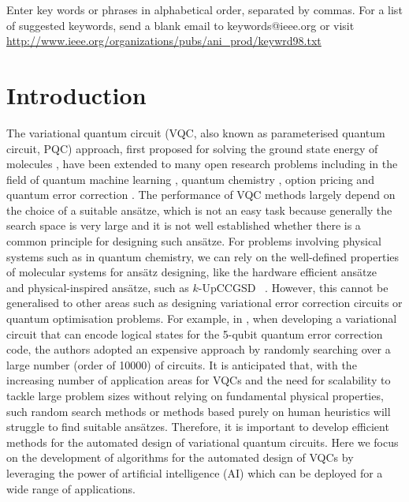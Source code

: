 \documentclass{ieeeaccess}
\begin{document}
\begin{keywords}
Enter key words or phrases in alphabetical 
order, separated by commas. For a list of suggested keywords, send a blank 
email to keywords@ieee.org or visit \underline
{http://www.ieee.org/organizations/pubs/ani\_prod/keywrd98.txt}
\end{keywords}

\titlepgskip=-15pt

\maketitle

\section{Introduction}
The variational quantum circuit (VQC, also known as parameterised quantum circuit, PQC) approach, first proposed for solving the ground state energy of molecules \cite{peruzzo2014variational}, have been extended to many open research problems including in the field of quantum machine learning \cite{schuldpetruccione2021}, quantum chemistry \cite{RevModPhys.92.015003}, option pricing \cite{2020optionpricing} and quantum error correction \cite{johnson2017qvector, Xu2021-dt}. The performance of VQC methods largely depend on the choice of a suitable ans\"atze, which is not an easy task because generally the search space is very large and it is not well established whether there is a common principle for designing such ans\"atze. For problems involving physical systems such as in quantum chemistry, we can rely on the well-defined properties of molecular systems for ans\"atz designing, like the  hardware efficient ans\"atze~\cite{2017hardwareefficientvqe} and physical-inspired ans\"atze, such as $k$-UpCCGSD~ \cite{physicalinspiredansatze1doi:10.1021/acs.jctc.8b01004}. However, this cannot be generalised to other areas such as designing variational error correction circuits or quantum optimisation problems. For example, in \cite{Xu2021-dt}, when developing a variational circuit that can encode logical states for the 5-qubit quantum error correction code, the authors adopted an expensive approach by randomly searching over a large number (order of 10000) of circuits. It is anticipated that, with the increasing number of application areas for VQCs and the need for scalability to tackle large problem sizes without relying on fundamental physical properties, such random search methods or methods based purely on human heuristics will struggle to find suitable ans\"atzes. Therefore, it is important to develop efficient methods for the automated design of variational quantum circuits. Here we focus on the development of algorithms for the automated design of VQCs by leveraging the power of artificial intelligence (AI) which can be deployed for a wide range of applications.
\end{document}
